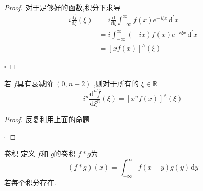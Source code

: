 \documentclass[../../main.tex]{subfiles}
\begin{document}
\begin{proof}
    对于足够好的函数,积分下求导 \[
    \begin{aligned}
    i \frac{\mathrm{d}\hat{f}}{\mathrm{d} \xi }\left(  \xi  \right)&= i \frac{\mathrm{d}}{\mathrm{d} \xi } \int_{-\infty}^{\infty} f\left( x \right) e^{-i \xi x}\,\mathrm{d} ^{\prime} x  \\ 
     &= i \int_{-\infty}^{\infty} \left( -ix \right) f\left( x \right)e^{-i \xi x}\,\mathrm{d} ^{\prime} x\\ 
      &= \left[ xf\left( x \right)  \right]^{\wedge }\left(  \xi  \right)    
    \end{aligned} 
    \]

    \hfill $\square$
\end{proof}
\begin{corollary}
    若 \(  f  \)具有衰减阶 \(  \left( 0,n+ 2 \right)   \)  ,则对于所有的 \(   \xi \in \mathbb{R}   \) \[
    i^{n}\frac{\mathrm{d}^{n } \hat{f}}{\mathrm{d} \xi ^{n}}\left(  \xi  \right)= \left[ x^{n}f\left( x \right)  \right]  ^{\wedge }\left(  \xi  \right) 
    \] 
\end{corollary}
\begin{proof}
    反复利用上面的命题

    \hfill $\square$
\end{proof}

\begin{center}
\end{center}

\begin{definition}{卷积}
    定义 \(  f  \)和 \(  g  \)的卷积 \(  f*g  \)为 \[
    \left( f*g \right)\left( x \right)  = \int_{-\infty}^{\infty}f\left( x-y \right)g\left( y \right)\,\mathrm{d} y  
    \]若每个积分存在.   
\end{definition}
\end{document}
